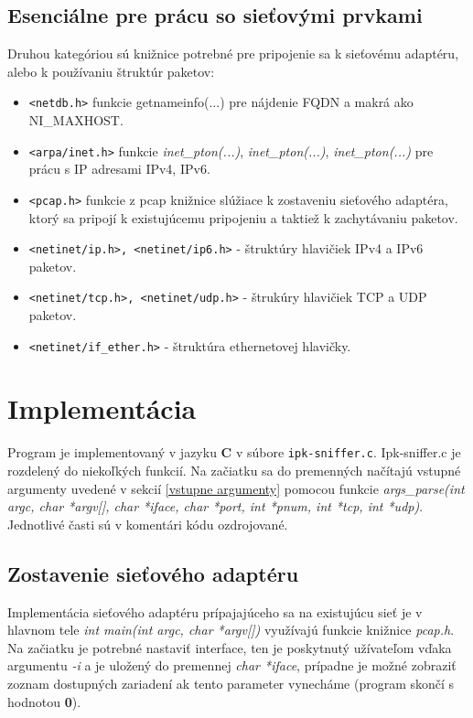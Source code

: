 \documentclass[11pt, a4paper]{article}
\begin{document}
	\subsection{Esenciálne pre prácu so sieťovými prvkami}
	Druhou kategóriou sú knižnice potrebné pre pripojenie sa k sieťovému adaptéru, alebo k používaniu štruktúr paketov:
	\begin{itemize}
	\item \texttt{<netdb.h>} funkcie getnameinfo(...) pre nájdenie FQDN a makrá ako NI\_MAXHOST.
	\item \texttt{<arpa/inet.h>} funkcie \emph{inet\_pton(...)}, \emph{inet\_pton(...)}, \emph{inet\_pton(...)} pre prácu s IP adresami IPv4, IPv6.
	\item \texttt{<pcap.h>} funkcie z pcap knižnice slúžiace k zostaveniu sieťového adaptéra, ktorý sa pripojí k existujúcemu pripojeniu a taktiež k zachytávaniu paketov.
	\item \texttt{<netinet/ip.h>, <netinet/ip6.h>} - štruktúry hlavičiek IPv4 a IPv6 paketov.
	\item \texttt{<netinet/tcp.h>, <netinet/udp.h>} - štrukúry hlavičiek TCP a UDP paketov.
	\item \texttt{<netinet/if\_ether.h>} - štruktúra ethernetovej hlavičky.
	\end{itemize}

	
	
	\newpage
	\section{Implementácia}
	Program je implementovaný v jazyku \textbf{C} v súbore \texttt{ipk-sniffer.c}.  
	Ipk-sniffer.c je rozdelený do niekoľkých funkcií. Na začiatku sa do premenných načítajú vstupné argumenty uvedené v sekcií \ref{vstupne argumenty} pomocou funkcie \emph{args\_parse(int argc, char *argv[], char *iface, char *port, int *pnum, int *tcp, int *udp)}. 
Jednotlivé časti sú v komentári kódu ozdrojované.
	
	\subsection{Zostavenie sieťového adaptéru}
	Implementácia sieťového adaptéru prípajajúceho sa na existujúcu sieť je v hlavnom tele \emph{int main(int argc, char *argv[])} využívajú funkcie knižnice \emph{pcap.h}. Na začiatku je potrebné nastaviť interface, ten je poskytnutý užívateľom vďaka argumentu \emph{-i} a je uložený do premennej \emph{char *iface}, prípadne je možné zobraziť zoznam dostupných zariadení ak tento parameter vynecháme (program skončí s hodnotou \textbf{0}).
	
\end{document}
